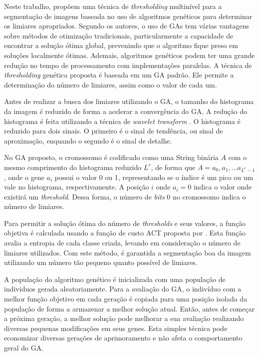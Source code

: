 \documentclass[12pt,oneside,a4paper,english,french,spanish,brazil,]{abntex2}
\begin{document}
Neste trabalho, \citet{hammouche:2008} propõem uma técnica de \textit{thresholding} multinível para a segmentação de imagens baseada no uso de algoritmos genéticos para determinar os limiares apropriados. Segundo os autores, o uso de GAs tem várias vantagens sobre métodos de otimização tradicionais, particularmente a capacidade de encontrar a solução ótima global, prevenindo que o algoritmo fique preso em soluções localmente ótimas. Ademais, algoritmos genéticos podem ter uma grande redução no tempo de processamento com implementações paralelas. A técnica de \textit{thresholding} genética proposta é baseada em um GA padrão. Ele permite a determinação do número de limiares, assim como o valor de cada um. 

Antes de realizar a busca dos limiares utilizando o GA, o tamanho do histograma da imagem é reduzido de forma a acelerar a convergência do GA. A redução do histograma é feita utilizando a técnica de \textit{wavelet transform} \cite{kim:2003}. O histograma é reduzido para dois sinais. O primeiro é o sinal de tendência, ou sinal de aproximação, enquando o segundo é o sinal de detalhe.

No GA proposto, o cromossomo é codificado como uma String binária \(A\) com o mesmo comprimento do histograma reduzido \(L^r\), de forma que \(A = a_0, a_1, ... a_{L^r-1}\), onde o gene \(a_i\) possui o valor 0 ou 1, representando se o índice é um pico ou um vale no histograma, respectivamente. A posição \(i\) onde \(a_i = 0\) indica o valor onde existirá um \textit{threshold}. Dessa forma, o número de \textit{bits} 0 no cromossomo indica o número de limiares.

Para permitir a solução ótima do número de \textit{thresholds} e seus valores, a função objetiva é calculada usando a função de custo ACT proposta por \citet{yen:1995}. Esta função avalia a entropia de cada classe criada, levando em consideração o número de limiares utilizados. Com este método, é garantida a segmentação boa da imagem utilizando um número tão pequeno quanto possível de limiares.

A população do algoritmo genético é inicializada com uma população de individuos gerada aleatoriamente. Para a avaliação do GA, o indivíduo com a melhor função objetivo em cada geração é copiada para uma posição isolada da população de forma a armazenar a melhor solução atual. Então, antes de começar a próxima geração, a melhor solução pode melhorar a sua avaliação realizando diversas pequenas modificações em seus genes. Esta simples técnica pode economizar diversas gerações de aprimoramento e não afeta o comportamento geral do GA.
\end{document}
